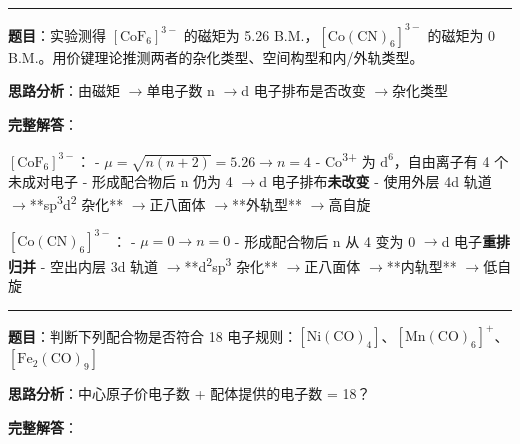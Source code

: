 \documentclass[a4paper,11pt]{ctexart}
\newcommand{\箭}{\ensuremath{\rightarrow}}
\newcommand{\左箭}{\ensuremath{\leftarrow}}
\newcommand{\上箭}{\ensuremath{\uparrow}}
\newcommand{\下箭}{\ensuremath{\downarrow}}
\newcommand{\衡}{\ensuremath{\rightleftharpoons}}
\newcommand{\双箭}{\ensuremath{\leftrightarrow}}
\newcommand{\约等于}{\ensuremath{\approx}}
\newcommand{\小于等于}{\ensuremath{\leq}}
\newcommand{\大于等于}{\ensuremath{\geq}}
\newcommand{\不等于}{\ensuremath{\neq}}
\newcommand{\西格马}{\ensuremath{\sigma}}
\newcommand{\派}{\ensuremath{\pi}}
\begin{document}
\begin{center}\rule{0.5\linewidth}{0.5pt}\end{center}

\textbf{题目}：实验测得 \([\mathrm{CoF_6}]^{3-}\) 的磁矩为 5.26 B.M.，\([\mathrm{Co(CN)_6}]^{3-}\) 的磁矩为 0 B.M.。用价键理论推测两者的杂化类型、空间构型和内/外轨类型。

\textbf{思路分析}：由磁矩 \箭 单电子数 n \箭 d 电子排布是否改变 \箭 杂化类型

\textbf{完整解答}：

\textbf{\([\mathrm{CoF_6}]^{3-}\)}：
- \(\mu = \sqrt{n(n+2)} = 5.26 \rightarrow n = 4\)
- Co\textsuperscript{3+} 为 \(\mathrm{d^6}\)，自由离子有 4 个未成对电子
- 形成配合物后 n 仍为 4 \箭 d 电子排布\textbf{未改变}
- 使用外层 4d 轨道 \箭 **sp\textsuperscript{3}d\textsuperscript{2} 杂化** \箭 正八面体 \箭 **外轨型** \箭 高自旋

\textbf{\([\mathrm{Co(CN)_6}]^{3-}\)}：
- \(\mu = 0 \rightarrow n = 0\)
- 形成配合物后 n 从 4 变为 0 \箭 d 电子\textbf{重排归并}
- 空出内层 3d 轨道 \箭 **d\textsuperscript{2}sp\textsuperscript{3} 杂化** \箭 正八面体 \箭 **内轨型** \箭 低自旋

\begin{center}\rule{0.5\linewidth}{0.5pt}\end{center}

\textbf{题目}：判断下列配合物是否符合 18 电子规则：\(\mathrm{[Ni(CO)_4]}\)、\(\mathrm{[Mn(CO)_6]^+}\)、\(\mathrm{[Fe_2(CO)_9]}\)

\textbf{思路分析}：中心原子价电子数 + 配体提供的电子数 = 18？

\textbf{完整解答}：
\end{document}
